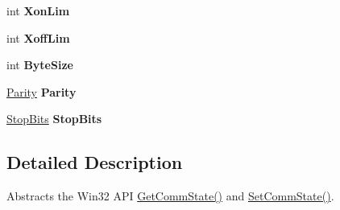 \begin{DoxyCompactItemize}
\item 
\mbox{\label{class_r_j_c_p_1_1_i_o_1_1_ports_1_1_native_1_1_windows_1_1_comm_state_a73e81c0d0d9ded99272fe55634d1e41a}} 
int {\bfseries Xon\+Lim}
\item 
\mbox{\label{class_r_j_c_p_1_1_i_o_1_1_ports_1_1_native_1_1_windows_1_1_comm_state_a1c0f2b6ec1870c60f72fc281631f5b0f}} 
int {\bfseries Xoff\+Lim}
\item 
\mbox{\label{class_r_j_c_p_1_1_i_o_1_1_ports_1_1_native_1_1_windows_1_1_comm_state_a2cec82bd3d9c30586c0631a9905335ac}} 
int {\bfseries Byte\+Size}
\item 
\mbox{\label{class_r_j_c_p_1_1_i_o_1_1_ports_1_1_native_1_1_windows_1_1_comm_state_af7dcd73d4412f6338493721d5e3a4b91}} 
\mbox{\hyperlink{namespace_r_j_c_p_1_1_i_o_1_1_ports_a35c8c760a80dd0392e605dd3ad169954}{Parity}} {\bfseries Parity}
\item 
\mbox{\label{class_r_j_c_p_1_1_i_o_1_1_ports_1_1_native_1_1_windows_1_1_comm_state_a314c48db74260d758ccd763a6d863e26}} 
\mbox{\hyperlink{namespace_r_j_c_p_1_1_i_o_1_1_ports_a56a13b591d46736acafe20f2976c84fa}{Stop\+Bits}} {\bfseries Stop\+Bits}
\end{DoxyCompactItemize}


\subsection{Detailed Description}
Abstracts the Win32 A\+PI \mbox{\hyperlink{class_r_j_c_p_1_1_i_o_1_1_ports_1_1_native_1_1_windows_1_1_comm_state_a49fb7ac8787598bf4f135c6a867ec59e}{Get\+Comm\+State()}} and \mbox{\hyperlink{class_r_j_c_p_1_1_i_o_1_1_ports_1_1_native_1_1_windows_1_1_comm_state_a0a20f9d712c5ad860155845b1dffd56b}{Set\+Comm\+State()}}. 



